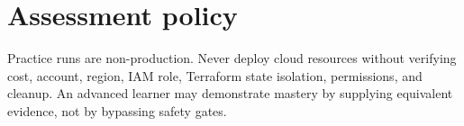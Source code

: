 \documentclass[10pt,letterpaper]{article}
\begin{document}
\section{Assessment policy}
Practice runs are non-production. Never deploy cloud resources without verifying cost, account, region, IAM role, Terraform state isolation, permissions, and cleanup. An advanced learner may demonstrate mastery by supplying equivalent evidence, not by bypassing safety gates.
\end{document}
